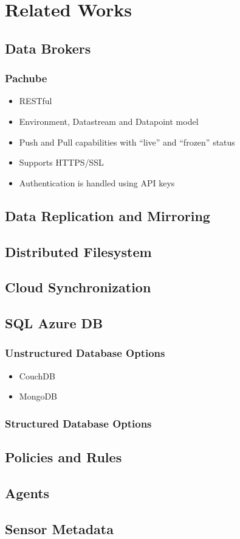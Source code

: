 \section{Related Works}
	\subsection{Data Brokers}
		\subsubsection{Pachube}
\begin{itemize}
\item RESTful
\item Environment, Datastream and Datapoint model
\item Push and Pull capabilities with ``live'' and ``frozen'' status
\item Supports HTTPS/SSL
\item Authentication is handled using API keys
\end{itemize}		
	\subsection{Data Replication and Mirroring}
	\subsection{Distributed Filesystem}
	\subsection{Cloud Synchronization}
	\subsection{SQL Azure DB}
	\subsubsection{Unstructured Database Options}
\begin{itemize}
\item CouchDB
\item MongoDB
\end{itemize}
	\subsubsection{Structured Database Options}
	\subsection{Policies and Rules}
	\subsection{Agents}
	\subsection{Sensor Metadata}
